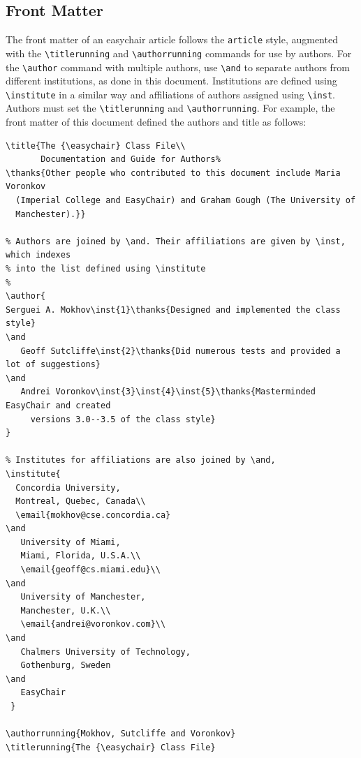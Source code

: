 \documentclass[EPiC]{easychair}
\newcommand{\easychair}{\textsf{easychair}}
\begin{document}
\subsection{Front Matter}
\label{sect:front-matter}

The front matter of an {\easychair} article follows the \texttt{article}
style, augmented with the \verb+\titlerunning+ and \verb+\authorrunning+
commands for use by authors. 
For the \verb+\author+ command with multiple authors, use \verb+\and+ to
separate authors from different institutions, as done in this document.
Institutions are defined using \verb+\institute+ in a similar way and affiliations of authors assigned using \verb+\inst+.
Authors must set the \verb+\titlerunning+ and \verb+\authorrunning+.
For example, the front matter of this document defined the authors
and title as follows:


\noindent\small
\begin{verbatim}
\title{The {\easychair} Class File\\
       Documentation and Guide for Authors%
\thanks{Other people who contributed to this document include Maria Voronkov
  (Imperial College and EasyChair) and Graham Gough (The University of
  Manchester).}}

% Authors are joined by \and. Their affiliations are given by \inst, which indexes
% into the list defined using \institute
%
\author{
Serguei A. Mokhov\inst{1}\thanks{Designed and implemented the class style}
\and
   Geoff Sutcliffe\inst{2}\thanks{Did numerous tests and provided a lot of suggestions}
\and
   Andrei Voronkov\inst{3}\inst{4}\inst{5}\thanks{Masterminded EasyChair and created 
     versions 3.0--3.5 of the class style}
}

% Institutes for affiliations are also joined by \and,
\institute{
  Concordia University,
  Montreal, Quebec, Canada\\
  \email{mokhov@cse.concordia.ca}
\and
   University of Miami,
   Miami, Florida, U.S.A.\\
   \email{geoff@cs.miami.edu}\\
\and
   University of Manchester,
   Manchester, U.K.\\
   \email{andrei@voronkov.com}\\
\and
   Chalmers University of Technology,
   Gothenburg, Sweden
\and
   EasyChair
 }

\authorrunning{Mokhov, Sutcliffe and Voronkov}
\titlerunning{The {\easychair} Class File}
\end{verbatim}
\normalsize
\end{document}
